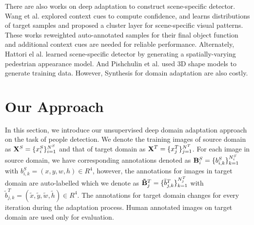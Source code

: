 \documentclass[runningheads]{llncs}
\begin{document}
There are also works on deep adaptation to construct scene-specific detector. Wang et al.\cite{wang2014scene} explored context cues to compute confidence, and \cite{zeng2014deep} learns distributions of target samples and proposed a cluster layer for scene-specific visual patterns. These works reweighted auto-annotated samples for their final object function and additional context cues are needed for reliable performance. Alternately, Hattori el al. \cite{hattori2015learning} learned scene-specific detector by generating a spatially-varying pedestrian appearance model. And Pishchulin et al. \cite{pishchulin2011learning} used 3D shape models to generate training data. However, Synthesis for domain adaptation are also costly.

\section{Our Approach}
\label{sec:Our Approach}

In this section, we introduce our unsupervised deep domain adaptation approach on the task of people detection. We denote the training images of source domain as  ${\bf X}^{S} = \{x^{S}_{i}\}^{N^{S}}_{i=1}$ and that of target domain as ${\bf X}^{T} = \{x^{T}_{j}\}^{N^{T}}_{j=1}$. For each image in source domain, we have corresponding annotations denoted as ${\bf B}^{S}_{i} = \{b^{S}_{i,k}\}^{N^{S}_{i}}_{k=1}$ with $b^{S}_{i,k} = (x,y,w,h) \in R^{4}$, however, the annotations for images in target domain are auto-labelled which we denote as ${\bf \tilde{B}}^{T}_{j} = \{\tilde{b}^{T}_{j,k}\}^{N^{T}_{j}}_{k=1}$ with $\tilde{b}^{T}_{j,k} = (\tilde{x},\tilde{y},\tilde{w},\tilde{h}) \in R^{4}$. The annotations for target domain changes for every iteration during the adaptation process. Human annotated images on target domain are used only for evaluation.
\end{document}
